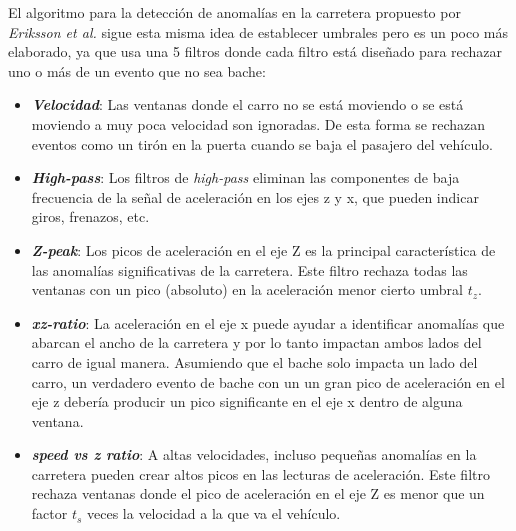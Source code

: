 		El algoritmo para la detección de anomalías en la carretera propuesto por \emph{Eriksson et al.} sigue
		esta misma idea de establecer umbrales pero es un poco más elaborado, ya que usa una 5 filtros donde cada filtro está diseñado
		para rechazar uno o más de un evento que no sea bache:\\

		\begin{itemize}
			\item \emph{\textbf {Velocidad}}: Las ventanas donde el carro no se está moviendo o se está moviendo a muy poca velocidad son ignoradas. 
				De esta forma se rechazan eventos como un tirón en la puerta cuando se baja el pasajero del vehículo.\\
			\item \emph{\textbf {High-pass}}: Los filtros de \emph{high-pass} eliminan las componentes de baja frecuencia de la señal de aceleración
				en los ejes z y x, que pueden indicar giros, frenazos, etc.\\
			\item  \emph{\textbf {Z-peak}}: Los picos de aceleración en el eje Z es la principal característica de las anomalías significativas de
				la carretera. Este filtro rechaza todas las ventanas con un pico (absoluto) en la aceleración menor cierto umbral $t_z$.\\
			\item \emph{\textbf {xz-ratio}}: La aceleración en el eje x puede ayudar a identificar anomalías que abarcan el ancho de la carretera
				y por lo tanto impactan ambos lados del carro de igual manera.  Asumiendo que el bache solo impacta un lado del carro, un verdadero
				evento de bache con un un gran pico de aceleración en el eje z debería producir un pico significante en el eje x dentro de alguna
				ventana.\\
			\item \emph{\textbf {speed vs z ratio}}: A altas velocidades, incluso pequeñas anomalías en la carretera pueden crear altos picos en las
				lecturas de aceleración. Este filtro rechaza ventanas donde el pico de aceleración en el eje Z es menor que un factor $t_s$ veces la
				velocidad a la que va el vehículo.
		\end{itemize}

